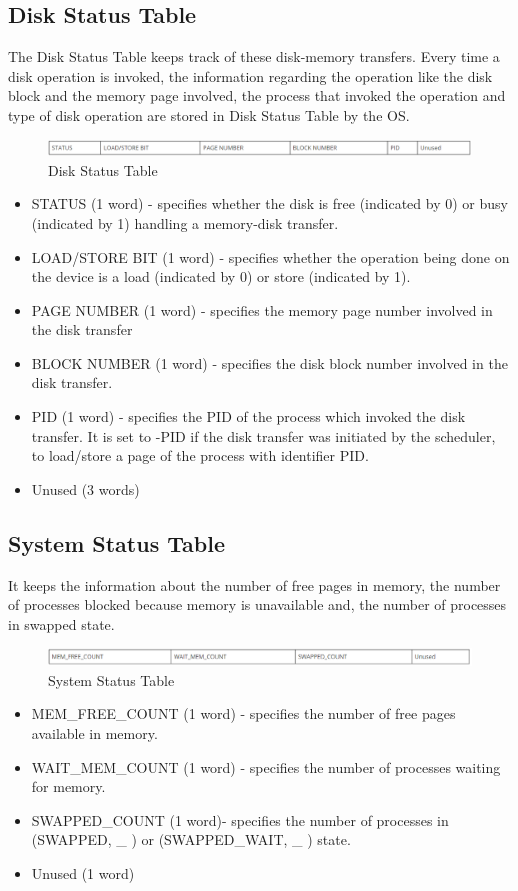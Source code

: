 \subsection{Disk Status Table}
The Disk Status Table keeps track of these disk-memory transfers. Every time a disk operation is invoked, the information regarding the operation like the disk block and the memory page involved, the process that invoked the operation and type of disk operation are stored in Disk Status Table by the OS.
\begin{figure}[ht]
\centering
\includegraphics  [scale=0.55]{figures/ds.png}
\caption{\footnotesize Disk Status Table}
\end{figure}
\begin {itemize}

\item STATUS (1 word) - specifies whether the disk is free (indicated by 0) or busy (indicated by 1) handling a memory-disk transfer.
\item LOAD/STORE BIT (1 word) - specifies whether the operation being done on the device is a load (indicated by 0) or store (indicated by 1).
\item PAGE NUMBER (1 word) - specifies the memory page number involved in the disk transfer
\item BLOCK NUMBER (1 word) - specifies the disk block number involved in the disk transfer.
\item PID (1 word) - specifies the PID of the process which invoked the disk transfer. It is set to -PID if the disk transfer was initiated by the scheduler, to load/store a page of the process with identifier PID.
\item Unused (3 words)

\end {itemize}

\subsection{System Status Table}
It keeps the information about the number of free pages in memory, the number of processes blocked because memory is unavailable and, the number of processes in swapped state. 
\begin{figure}[ht]
\centering
\includegraphics  [scale=0.55]{figures/sst.png}
\caption{\footnotesize System Status Table}
\end{figure}
\begin {itemize}
\item MEM\_FREE\_COUNT (1 word) - specifies the number of free pages available in memory.
\item WAIT\_MEM\_COUNT (1 word) - specifies the number of processes waiting for memory.
\item SWAPPED\_COUNT (1 word)- specifies the number of processes in (SWAPPED, \_ ) or (SWAPPED\_WAIT, \_ ) state.
\item Unused (1 word)
\end {itemize}

